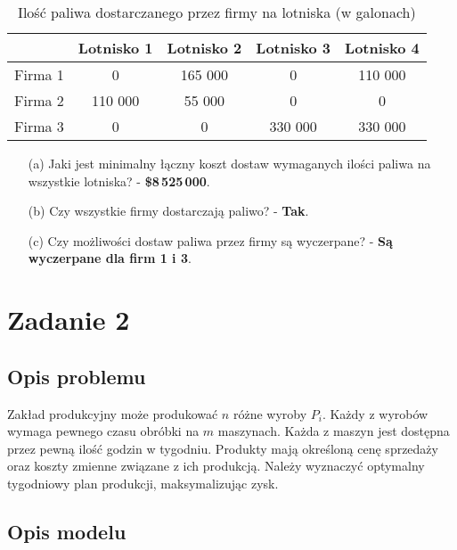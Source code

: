 \documentclass{article}
\begin{document}
\begin{table}[H]
    \centering
    \caption{Ilość paliwa dostarczanego przez firmy na lotniska (w galonach)}
    \begin{tabular}{|c|c|c|c|c|}
        \hline
        & Lotnisko 1 & Lotnisko 2 & Lotnisko 3 & Lotnisko 4 \\ \hline
        Firma 1 & 0 & 165 000 & 0 & 110 000 \\ \hline
        Firma 2 & 110 000 & 55 000 & 0 & 0 \\ \hline
        Firma 3 & 0 & 0 & 330 000 & 330 000 \\ \hline
    \end{tabular}
\end{table}

\begin{enumerate}
    \item[(a)] Jaki jest minimalny łączny koszt dostaw wymaganych ilości paliwa na wszystkie lotniska? - \textbf{\$8\,525\,000}.

    \item[(b)] Czy wszystkie firmy dostarczają paliwo? - \textbf{Tak}.

    \item[(c)] Czy możliwości dostaw paliwa przez firmy są wyczerpane? - \textbf{Są wyczerpane dla firm 1 i 3}.
\end{enumerate}

\section{Zadanie 2}
\subsection{Opis problemu}
Zakład produkcyjny może produkować $n$ różne wyroby \( P_i \). Każdy z wyrobów wymaga pewnego czasu obróbki na $m$ maszynach. Każda z maszyn jest dostępna przez pewną ilość godzin w tygodniu. Produkty mają określoną cenę sprzedaży oraz koszty zmienne związane z ich produkcją. Należy wyznaczyć optymalny tygodniowy plan produkcji, maksymalizując zysk.

\subsection{Opis modelu}
\end{document}
